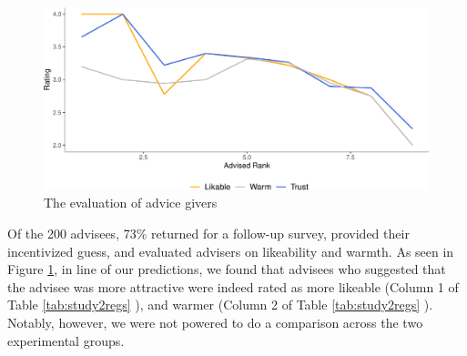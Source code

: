 \documentclass[
  man,floatsintext]{apa6}
\begin{document}
\begin{figure}

{\centering \includegraphics{Advice-Giving_files/figure-latex/study2rating-1} 

}

\caption{The evaluation of advice givers}\label{fig:study2rating}
\end{figure}

Of the 200 advisees, 73\% returned for a follow-up survey, provided their incentivized guess, and evaluated advisers on likeability and warmth. As seen in Figure \ref{fig:study2rating}, in line of our predictions, we found that advisees who suggested that the advisee was more attractive were indeed rated as more likeable (Column 1 of Table \ref{tab:study2regs} ), and warmer (Column 2 of Table \ref{tab:study2regs} ). Notably, however, we were not powered to do a comparison across the two experimental groups.
\end{document}
